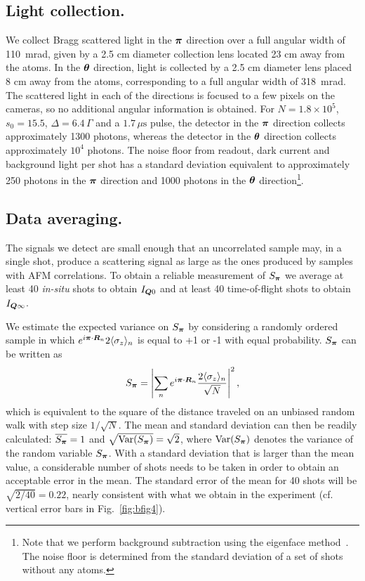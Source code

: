 \subsection{Light collection.} We collect Bragg scattered light in the
$\bm{\pi}$ direction over a full angular width of  110~mrad,  given by a 2.5
cm diameter collection lens located 23 cm away from the atoms.    In the
$\bm{\theta}$ direction, light is collected by a 2.5 cm diameter  lens
placed 8 cm away from the atoms, corresponding to a full angular width of
318~mrad.  The scattered light in each of the directions is focused to a few
pixels on the cameras, so no additional angular information is obtained.
For $N=1.8\times10^{5}$, $s_{0}=15.5$, $\Delta=6.4\,\Gamma$ and a
$1.7\,\mu\text{s}$ pulse, the detector in the $\bm{\pi}$ direction collects
approximately 1300 photons, whereas the detector in the $\bm{\theta}$
direction collects approximately $10^4$ photons.   The noise floor from
readout, dark current and background light per shot has a standard deviation
equivalent to approximately 250 photons in the $\bm{\pi}$ direction and 1000
photons in the $\bm{\theta}$ direction\footnote{Note that we perform
background subtraction using the eigenface method~\cite{PhysRevA.82.061606}.
The noise floor is determined from the standard deviation of a set of shots
without any atoms.}.

\subsection{Data averaging.} The signals we detect are small enough that an
uncorrelated sample may, in a single shot, produce a scattering signal as
large as the ones produced by samples with AFM correlations.  To obtain a
reliable measurement of $S_{\bm{\pi}}$ we average at least 40
\textit{in-situ} shots to obtain $I_{\bm{Q}0}$ and at least 40
time-of-flight shots to obtain $I_{\bm{Q}\infty}$.
 
We estimate the expected variance on $S_{\bm{\pi}}$ by considering a
randomly ordered sample in which
$e^{i\bm{\pi}\cdot\bm{R}_{n}}2\langle\sigma_{z}\rangle_{n} $  is equal to +1
or -1 with equal probability.  $S_{\bm{\pi}}$ can be written as
\begin{equation*}
  S_{\bm{\pi}} =
    \left| \sum_{n} e^{i\bm{\pi}\cdot \bm{R}_{n}}
    \frac{2 \langle \sigma_{z}  \rangle_{n} }{\sqrt{N}}  \right|^{2}, 
\end{equation*}
which is equivalent to the square of the distance traveled on an unbiased
random walk with step size $1/\sqrt{N}$.   The mean and standard deviation can
then be readily calculated: $\overline{S_{\bm{\pi}}}=1$ and
$\sqrt{\text{Var}(S_{\bm{\pi}})}=\sqrt{2}$, where $\text{Var}(S_{\bm{\pi}})$
denotes the variance of the random variable $S_{\bm{\pi}}$.  With a standard
deviation that is larger than the mean value, a considerable number of shots
needs to be taken in order to obtain an acceptable error in the mean.    The
standard error of the mean for 40 shots will be $\sqrt{2/40}=0.22$, nearly
consistent with what we obtain in the experiment (cf. vertical error bars in
Fig.~\ref{fig:bfig4}).

